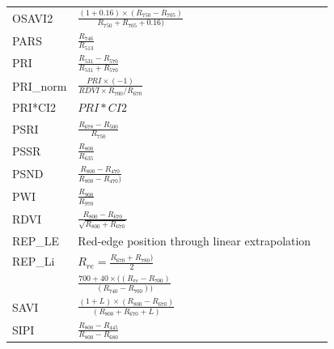 \documentclass[letterpaper, peerreview, draftcls]{IEEEtran}
\begin{document}
\begin{xtabular*}{0.3\textwidth}{lll}
	OSAVI2         & $\frac{(1+0.16)\times (R_{750}-R_{705})}{R_{750}+R_{705}+0.16) }$                                    & \cite{wu2008a} \\
	PARS           & $\frac{R_{746}}{R_{513}}$                                                                            & \cite{chappelle1992} \\
	PRI            & $\frac{R_{531}-R_{570}}{R_{531}+R_{570}}$                                                            & \cite{gamon1992}\\
	PRI\_norm      & $\frac{PRI \times (-1) }{RDVI\times R_{700}/R_{670}}$                                                & \cite{zarco-tejada2013a}\\
	PRI*CI2        & $PRI*CI2$                                                                                            & \cite{garrity2011} \\
	PSRI           & $\frac{R_{678}-R_{500}}{R_{750}}$                                                                    & \cite{merzlyak1999} \\
	PSSR           & $\frac{R_{800}}{R_{635}}$                                                                            & \cite{blackburn1998} \\
	PSND           & $\frac{R_{800}-R_{470}}{R_{800}-R_{470})}$                                                           & \cite{blackburn1998} \\
	PWI            & $\frac{R_{900}}{R_{970}}$                                                                            & \cite{penuelas1997} \\
	RDVI           & $\frac{R_{800}-R_{670}}{ \sqrt{R_{800}+R_{670}}}$                                                    & \cite{roujean1995} \\
	\midrule
	REP\_LE        & \parbox{3.8cm}{Red-edge position through linear extrapolation}                                       & \cite{cho2006} \\
	\midrule
	REP\_Li        & $R_{re}=\frac{R_{670}+R_{780})}{2}$                                                                  & \cite{guyot1988} \\
	& $\frac{700 + 40 \times ((R_{re} -R_{700})}{(R_{740}-R_{700}))}$ & \\
	\midrule
	SAVI           & $\frac{(1+L)\times (R_{800}-R_{670})}{(R_{800}+R_{670}+L)}$                                          & \cite{huete1988} \\
	SIPI           & $\frac{R_{800}-R_{445}}{R_{800}-R_{680}}$                                                            & \cite{pen-uelas1995} \\

\end{xtabular*}
\end{document}
